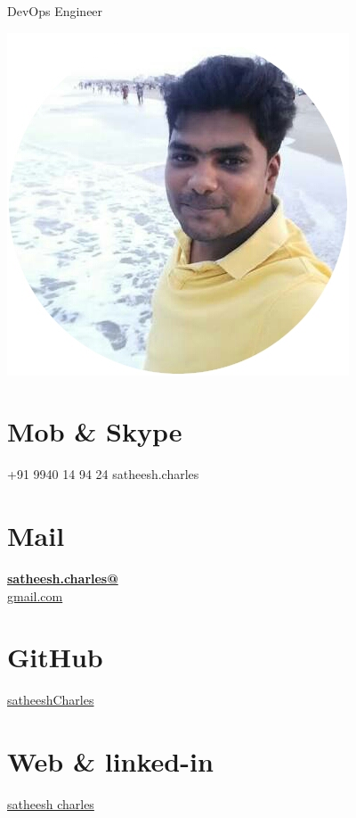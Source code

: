 \documentclass[]{friggeri-cv}
\begin{document}
      {DevOps Engineer}
      

\begin{aside}
  \includegraphics[scale=0.30]{img/Satt.jpg}
  \section{Mob \& Skype}
    +91 9940 14 94 24
    satheesh.charles
    ~
  \section{Mail}
    \href{mailto:satheesh.charles@gmail.com}{\textbf{satheesh.charles@}\\gmail.com}
    ~
    \section{GitHub}
    \href{https://github.com/satheeshCharles}{satheeshCharles}
    ~
  \section{Web \& linked-in}
    \href{https://www.linkedin.com/in/satheesh-charles/}{satheesh charles}
    ~
    ~
    ~

\end{aside}
\end{document}
